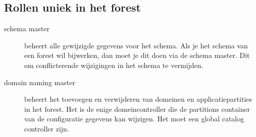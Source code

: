 \subsection{Rollen uniek in het forest}
\begin{description}
	\item[schema master] beheert alle gewijzigde gegevens voor het schema.
		Als je het schema van een forest wil bijwerken, dan moet je dit
		doen via de schema master. Dit om conflicterende wijzigingen in
		het schema te vermijden.
	\item[domain naming master] beheert het toevoegen en verwijderen van
		domeinen en applicatiepartities in het forest. Het is de enige
		domeincontroller die de partitions container van de configuratie
		gegevens kan wijzigen. Het moet een global catalog controller
		zijn.
\end{description}
